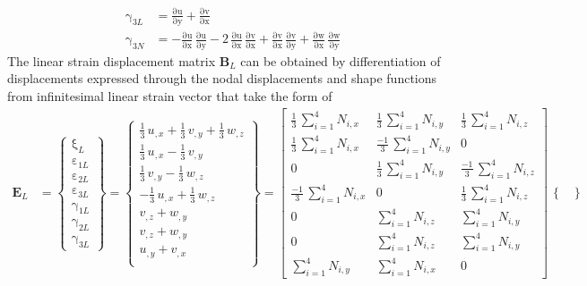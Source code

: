 \begin{subequations}
\begin{align}
	\mathrm \gamma_{3L} & = \mathrm{\frac{\partial u}{\partial y}} + \mathrm{\frac{\partial v}{\partial x}}\\
	\mathrm \gamma_{3N} & = - \mathrm{\frac{\partial u}{\partial x}}\, \mathrm{\frac{\partial u}{\partial y}} - 2 \, \mathrm{\frac{ \partial u}{\partial x}}\, \mathrm{\frac{ \partial v}{\partial x}} + \mathrm{\frac{\partial v}{\partial x}}\, \mathrm{\frac{\partial v}{\partial y}} + \mathrm{\frac{\partial w}{\partial x}}\, \mathrm{\frac{\partial w}{\partial y}} 
	\end{align}
\end{subequations}
The linear strain displacement matrix $\mathbf{B}_L$ can be obtained by differentiation of displacements expressed through the nodal displacements and shape functions from infinitesimal linear strain vector that take the form of
\begin{equation}
\begin{aligned}
\mathbf{E}_L & =  \begin{Bmatrix}
\mathrm \xi_{L} \\
\mathrm \varepsilon_{1L} \\
\mathrm \varepsilon_{2L} \\
\mathrm \varepsilon_{3L} \\
\mathrm \gamma_{1L} \\
\mathrm \gamma_{2L} \\
\mathrm \gamma_{3L}\end{Bmatrix} = 
\begin{Bmatrix}
\tfrac{1}{3} \, u_{,x} + \tfrac{1}{3} \, v_{,y} + \tfrac{1}{3} \, w_{,z} \\
\tfrac{1}{3} \, u_{,x} - \tfrac{1}{3} \, v_{,y} \\
\tfrac{1}{3} \, v_{,y} - \tfrac{1}{3} \, w_{,z} \\
- \tfrac{1}{3} \, u_{,x} + \tfrac{1}{3} \, w_{,z} \\ 
v_{,z} +  w_{,y} \\ 
v_{,z} +  w_{,y} \\ 
u_{,y} +  v_{,x} \\\end{Bmatrix} = \begin{bmatrix}
\tfrac{1}{3} \, \sum\nolimits_{i=1}^4 N_{i,x}  & \tfrac{1}{3} \, \sum\nolimits_{i=1}^4 N_{i,y} & \tfrac{1}{3} \, \sum\nolimits_{i=1}^4 N_{i,z} \\
\tfrac{1}{3} \, \sum\nolimits_{i=1}^4 N_{i,x}  & \tfrac{-1}{3} \, \sum\nolimits_{i=1}^4 N_{i,y} & 0 \\ 0 & \tfrac{1}{3} \, \sum\nolimits_{i=1}^4 N_{i,y}  &  \tfrac{-1}{3} \, \sum\nolimits_{i=1}^4 N_{i,z} \\  \tfrac{-1}{3} \, \sum\nolimits_{i=1}^4 N_{i,x}  & 0 & \tfrac{1}{3} \, \sum\nolimits_{i=1}^4 N_{i,z} \\ 0 & \sum\nolimits_{i=1}^4 N_{i,z}  &  \sum\nolimits_{i=1}^4 N_{i,y} \\ 0 & \sum\nolimits_{i=1}^4 N_{i,z}  &  \sum\nolimits_{i=1}^4 N_{i,y} \\ \sum\nolimits_{i=1}^4 N_{i,y}  &  \sum\nolimits_{i=1}^4 N_{i,x} & 0 \end{bmatrix} \, \begin{Bmatrix}

\end{Bmatrix}
\end{aligned}
\end{equation}
